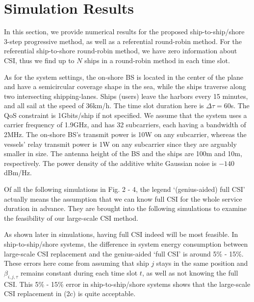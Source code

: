 \documentclass[journal]{IEEEtran}
\begin{document}
   \section{Simulation Results}\label{sec:4}
   
   In this section, we provide numerical results for the proposed ship-to-ship/shore 3-step progressive method, as well as a referential round-robin method. 
   For the referential ship-to-shore round-robin method, we have zero information about CSI, thus we find up to $N$ ships in a round-robin method in each time slot. 
   
   
   
   As for the system settings, the on-shore BS is located in the center of the plane and have a semicircular coverage shape in the sea, while the ships traverse along two intersecting shipping-lanes. 
   Ships (users) leave the harbors every 15 minutes, and all sail at the speed of 36km/h. The time slot duration here is $\Delta \tau = 60$s. The QoS constraint is 1Gbits/ship if not specified. We assume that the system uses a carrier frequency of 1.9GHz, and has 32 subcarriers, each having a bandwidth of 2MHz. The on-shore BS's transmit power is 10W on any subcarrier, whereas the vessels' relay transmit power is 1W on any subcarrier since they are arguably smaller in size. The antenna height of the BS and the ships are 100m and 10m, respectively. The power density of the additive white Gaussian noise is ${-140}$dBm/Hz. 
   
   Of all the following simulations in Fig. 2 - 4, %
   the legend `(genius-aided) full CSI' actually means the assumption that we can know full CSI for the whole service duration in advance. %
   They are brought into the following simulations to examine the feasibility of our large-scale CSI method. 
   
   
   As shown later in simulations, having full CSI indeed will be most feasible. In ship-to-ship/shore systems, the difference in system energy consumption between large-scale CSI replacement and the genius-aided `full CSI' is around 5\% - 15\%. These errors here come from assuming that ship $j$ stays in the same position and $\beta _{i,j,\tau }$ remains constant during each time slot $t$, as well as not knowing the full CSI.
   This 5\% - 15\% error in ship-to-ship/shore systems shows that the large-scale CSI replacement in (2c) is quite acceptable. 
    
\end{document}
